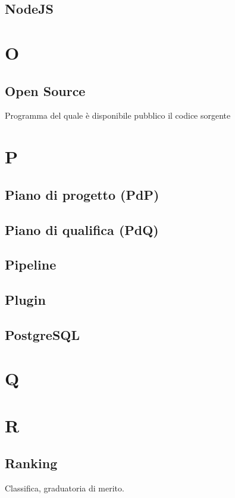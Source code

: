 \documentclass{classes/base}
\begin{document}
        \subsection*{NodeJS}
        \newpage  
    \section*{O}
        \subsection*{Open Source}
        Programma del quale è disponibile pubblico il codice sorgente 
        \newpage  
    \section*{P}
        \subsection*{Piano di progetto (PdP)}

        \subsection*{Piano di qualifica (PdQ)} 

        \subsection*{Pipeline}

        \subsection*{Plugin}

        \subsection*{PostgreSQL}
        \newpage  
    \section*{Q}
    \newpage  
    \section*{R}
        \subsection*{Ranking} 
        Classifica, graduatoria di merito. 
\end{document}
